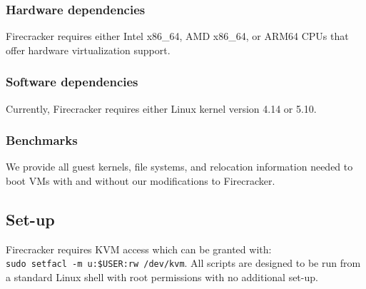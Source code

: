 \documentclass[sigplan,twocolumn]{acmart}
\begin{document}
\subsubsection{Hardware dependencies}
Firecracker requires either Intel x86\_64, AMD x86\_64, or ARM64 CPUs
that offer hardware virtualization support.

\subsubsection{Software dependencies} 
Currently, Firecracker requires either Linux kernel version 4.14 or 5.10.  

\subsubsection{Benchmarks} 
We provide all guest kernels, file systems, and relocation information needed to boot VMs with and without our modifications to Firecracker.
\subsection{Set-up}
Firecracker requires KVM access which can be granted with:\\ \texttt{sudo setfacl -m u:\$USER:rw /dev/kvm}.
All scripts are designed to be run from a standard Linux shell with root permissions with no additional set-up. 

\end{document}
